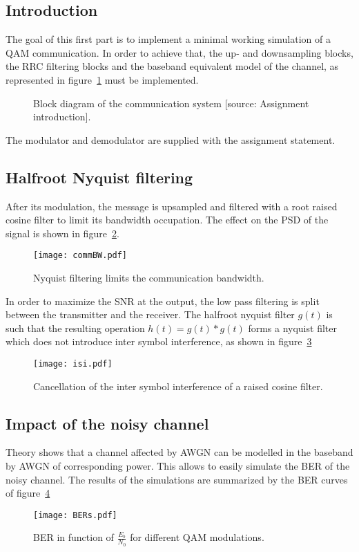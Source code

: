 \subsection{Introduction}
The goal of this first part is to implement a minimal working simulation of a QAM communication.
In order to achieve that, the up- and downsampling blocks, the RRC filtering blocks and the baseband equivalent model of the channel, as represented in figure~\ref{fig:chain} must be implemented.
\begin{figure}[htbp]
\centering

\caption{Block diagram of the communication system [source: Assignment introduction].\label{fig:chain}}
\end{figure}
The modulator and demodulator are supplied with the assignment statement.

\subsection{Halfroot Nyquist filtering}
After its modulation, the message is upsampled and filtered with a root raised cosine filter to limit its bandwidth occupation.
The effect on the PSD of the signal is shown in figure~\ref{fig:LPF}.
\begin{figure}[htbp]
\centering
\texttt{[image: commBW.pdf]}
\caption{Nyquist filtering limits the communication bandwidth.\label{fig:LPF}}
\end{figure}

In order to maximize the SNR at the output, the low pass filtering is split between the transmitter and the receiver.
The halfroot nyquist filter $g(t)$ is such that the resulting operation $h(t) = g(t)*g(t)$ forms a nyquist filter which does not introduce inter symbol interference, as shown in figure~\ref{fig:noISI}
\begin{figure}
\centering
\texttt{[image: isi.pdf]}
\caption{Cancellation of the inter symbol interference of a raised cosine filter.\label{fig:noISI}}
\end{figure}

\subsection{Impact of the noisy channel}
Theory shows that a channel affected by AWGN can be modelled in the baseband by AWGN of corresponding power.
This allows to easily simulate the BER of the noisy channel.
The results of the simulations are summarized by the BER curves of figure~\ref{fig:BER}
\begin{figure}[htbp]
\texttt{[image: BERs.pdf]}
\caption{BER in function of $\frac{E_b}{N_0}$ for different QAM modulations.\label{fig:BER}}
\end{figure}

